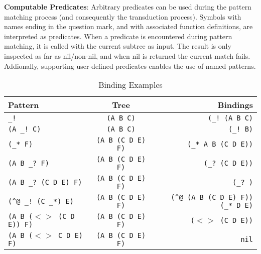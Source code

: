 \documentclass[a4,11pt]{article}
\begin{document}

{\bf Computable Predicates}:
Arbitrary predicates can be used during the pattern matching process (and consequently the transduction process).   Symbols with names ending in the question mark, and with associated function definitions, are interpreted as predicates.  When a predicate is encountered during pattern matching, it is called with the current subtree as input.  The result is only inspected as far as nil/non-nil, and when nil is returned the current match fails.  Addionally, supporting user-defined predicates enables the use of named patterns. 

\begin{table*}
  \begin{center}
  \begin{tabular} {l c r}
    Pattern  & Tree &   Bindings\\
    \hline
    \texttt{\_!}   & \texttt{(A B C)} & \texttt{(\_! (A B C)}\\
    \texttt{(A \_! C)}     &        \texttt{(A B C)}   &              \texttt{(\_! B)}\\
    \texttt{(\_* F)}       &        \texttt{(A B (C D E) F)}   &      \texttt{(\_*  A B (C D E))}\\
    \texttt{(A B \_? F)}   &        \texttt{(A B (C D E) F)}   &      \texttt{(\_? (C D E))}\\
    \texttt{(A B \_? (C D E) F)}  & \texttt{(A B (C D E) F)}   &      \texttt{(\_? )}\\
    \texttt{(\^{}@ \_! (C \_*) E)}   & \texttt{(A B (C D E) F)}   &   \texttt{(\^{}@ (A B (C D E) F))  (\_* D E)}\\
    \texttt{(A B ($<>$ (C D E)) F)}  & \texttt{(A B (C D E) F)}   &   \texttt{($<>$ (C D E))}\\
    \texttt{(A B ($<>$ C D E) F)}    & \texttt{(A B (C D E) F)}  &   \texttt{nil}\\
    \hline
  \end{tabular}
  \caption{Binding Examples}
  \end{center}
\end{table*}
\end{document}
